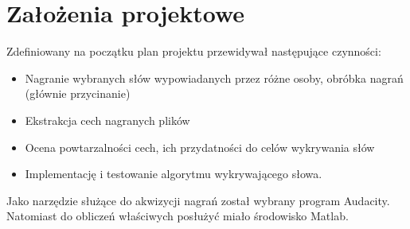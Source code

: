 \section{Założenia projektowe}

Zdefiniowany na początku plan projektu przewidywał następujące czynności:


\begin{itemize}
	\item Nagranie wybranych słów wypowiadanych przez różne osoby, obróbka nagrań (głównie przycinanie)
	\item Ekstrakcja cech nagranych plików
	\item Ocena powtarzalności cech, ich przydatności do celów wykrywania słów
	\item Implementację i testowanie algorytmu wykrywającego słowa.
\end{itemize}
	

Jako narzędzie służące do akwizycji nagrań został wybrany program Audacity. Natomiast do obliczeń właściwych posłużyć miało środowisko Matlab.
